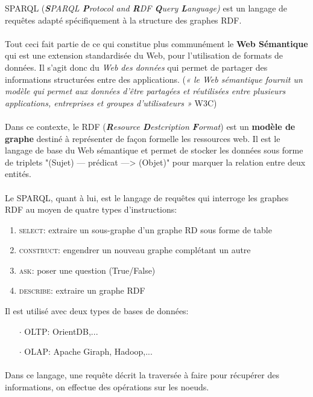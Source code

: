 \item{}
{\faux}
{SPARQL (\textit{\textbf{S}PARQL \textbf{P}rotocol and \textbf{R}DF \textbf{Q}uery \textbf{L}anguage)} est un langage de requêtes adapté spécifiquement à la structure des graphes RDF.
\paragraph{}
Tout ceci fait partie de ce qui constitue plus communément le \textbf{Web Sémantique} qui est une extension standardisée du Web, pour l'utilisation de formats de données. Il s'agit donc du \textit{Web des données} qui permet de partager des informations structurées entre des applications. (\textit{« le Web sémantique fournit un modèle qui permet aux données d'être partagées et réutilisées entre plusieurs applications, entreprises et groupes d'utilisateurs »} W3C)
\paragraph{}
Dans ce contexte, le RDF (\textit{\textbf{R}esource \textbf{D}estcription \textbf{F}ormat}) est un \textbf{modèle de graphe} destiné à représenter de façon formelle les ressources web. Il est le langage de base du Web sémantique et permet de stocker les données sous forme de triplets "(Sujet) --- prédicat ---> (Objet)" pour marquer la relation entre deux entités.
\paragraph{}
Le SPARQL, quant à lui, est le langage de requêtes qui interroge les graphes RDF au moyen de quatre types d'instructions:
\begin{enumerate}
\item\textcolor{ltred}{\textsc{select}}: extraire un sous-graphe d'un graphe RD sous forme de table
\item\textcolor{ltred}{\textsc{construct}}: engendrer un nouveau graphe complétant un autre
\item\textcolor{ltred}{\textsc{ask}}: poser une question (True/False)
\item\textcolor{ltred}{\textsc{describe}}: extraire un graphe RDF
\end{enumerate}
}

\item{}
{\vrai}
{Il est utilisé avec deux types de bases de données:
\begin{itemize}
\item[$\cdot$]OLTP: OrientDB,...
\item[$\cdot$]OLAP: Apache Giraph, Hadoop,...
\end{itemize}
\paragraph{}
Dans ce langage, une requête décrit la traversée à faire pour récupérer des informations, on effectue des opérations sur les noeuds.
}

